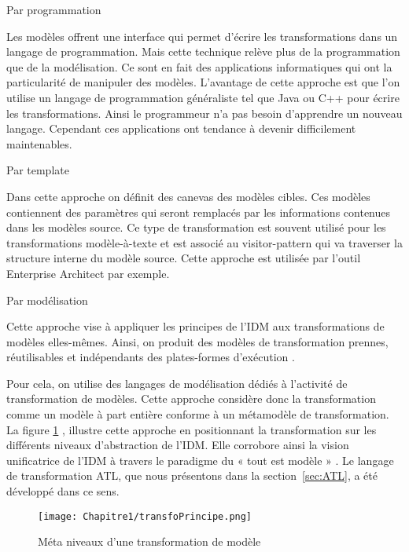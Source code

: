 \begin{bulletList}
\item Par programmation

Les modèles offrent une interface qui permet d'écrire les transformations dans un langage de programmation. Mais cette technique relève plus de la programmation que de la modélisation. Ce sont en fait des applications informatiques qui ont la particularité de manipuler des modèles. L'avantage de cette approche est que l'on utilise un langage de programmation généraliste tel que Java ou C++ pour écrire les transformations. Ainsi le programmeur n'a pas besoin d'apprendre un nouveau langage. Cependant ces applications ont tendance à devenir difficilement maintenables. 

\item Par template 

Dans cette approche on définit des canevas des modèles cibles. Ces modèles contiennent des paramètres qui seront remplacés par les informations contenues dans les modèles source. Ce type de transformation est souvent utilisé pour les transformations modèle-à-texte et est associé au visitor-pattern qui va traverser la structure interne du modèle source. Cette approche est utilisée par l'outil Enterprise Architect par exemple. 

\item Par modélisation

Cette approche vise à appliquer les principes de l'IDM aux transformations de modèles elles-mêmes. Ainsi, on produit des modèles de transformation prennes, réutilisables et indépendants des plates-formes d'exécution \cite{bezivin2006model}. 

Pour cela, on utilise des langages de modélisation dédiés à l'activité de transformation de modèles. Cette approche considère donc la transformation comme un modèle à part entière conforme à un métamodèle de transformation. La figure \ref{fig:TransfoPrincipe} , illustre cette approche en positionnant la transformation sur les différents niveaux d'abstraction de l'IDM. Elle corrobore ainsi la vision unificatrice de l'IDM à travers le paradigme du « tout est modèle » \cite{bezivin2005unification}. Le langage de transformation ATL, que nous présentons dans la section~\ref{sec:ATL}, a été développé dans ce sens. 

\end{bulletList}

\begin{figure}[!htbp]
 \begin{center}
  \texttt{[image: Chapitre1/transfoPrincipe.png]}
 \end{center}
 \caption{Méta niveaux d'une transformation de modèle}
 \label{fig:TransfoPrincipe}
\end{figure}

